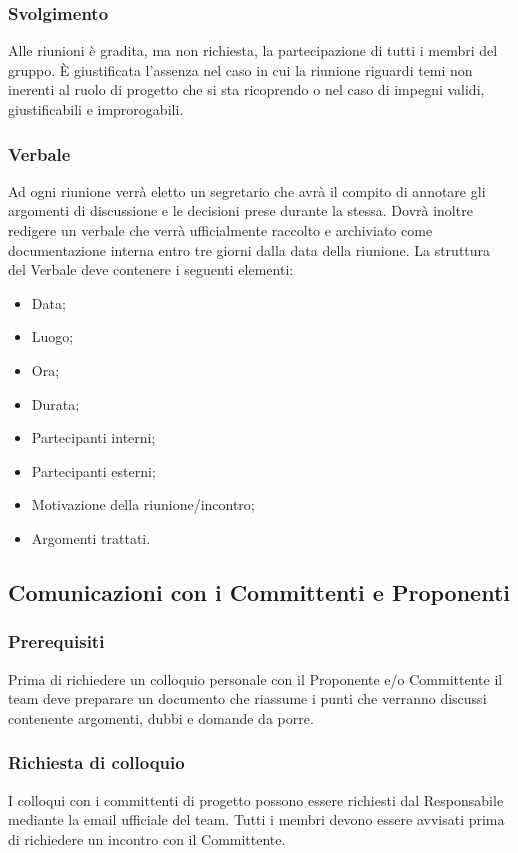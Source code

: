 \subsubsection{Svolgimento}
\label{3.3.2}
Alle riunioni è gradita, ma non richiesta, la partecipazione di tutti i membri del gruppo. È giustificata l'assenza nel caso in cui la riunione riguardi temi non inerenti al ruolo di progetto che si sta ricoprendo o nel caso di impegni validi, giustificabili e improrogabili.

\subsubsection{Verbale}
\label{3.3.3}
Ad ogni riunione verrà eletto un segretario che avrà il compito di annotare gli argomenti di discussione e le decisioni prese durante la stessa.
Dovrà inoltre redigere un verbale che verrà ufficialmente raccolto e archiviato come documentazione interna entro tre giorni dalla data della riunione.
La struttura del Verbale deve contenere i seguenti elementi:
\begin{itemize}
\item Data;
\item Luogo;
\item Ora;
\item Durata;
\item Partecipanti interni;
\item Partecipanti esterni;
\item Motivazione della riunione/incontro;
\item Argomenti trattati.
\end{itemize}

\subsection{Comunicazioni con i Committenti e Proponenti}
\label{3.4}

\subsubsection{Prerequisiti}
\label{3.4.1}
Prima di richiedere un colloquio personale con il Proponente e/o Committente il team deve preparare un documento che riassume i punti che verranno discussi contenente argomenti, dubbi e domande da porre.

\subsubsection{Richiesta di colloquio}
\label{3.4.2}
I colloqui con i committenti di progetto possono essere richiesti dal Responsabile mediante la email ufficiale del team. Tutti i membri devono essere avvisati prima di richiedere un incontro con il Committente.



